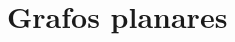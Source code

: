 %
%

\appendix
\setcounter{chapter}{3}
\renewcommand{\thechapter}{\Alph{chapter}}
\chapter[Grafos planares]{Grafos planares}

